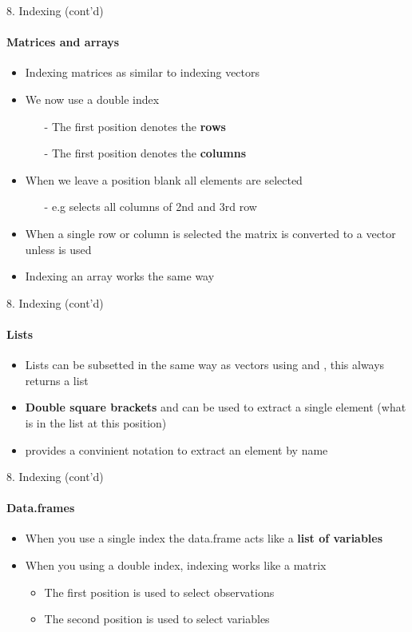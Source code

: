 \documentclass[14pt, aspectratio=169, sectionpage=simple, xclolor=table]{beamer}
\begin{document}
\begin{frame}[fragile]{8. Indexing (cont'd)}
\framesubtitle{Matrices and arrays}
\vspace*{-1ex}
\begin{itemize}
	\item Indexing matrices as similar to indexing vectors
	\item We now use a double index  
	\begin{itemize}
		\item[-] The first position denotes the \textbf{rows}
		\item[-] The first position denotes the \textbf{columns}
	\end{itemize}
    \item When we leave a position blank all elements are selected
   	\begin{itemize}
    	\item[-] e.g  selects all columns of 2nd and 3rd row
    \end{itemize}
     \item When a single row or column is selected the matrix is converted to a vector unless  is used
     \item Indexing an array works the same way
\end{itemize}
\end{frame}

\begin{frame}[fragile]{8. Indexing (cont'd)}
\vspace*{-1ex}
\framesubtitle{Lists}
\begin{itemize}
	\item Lists can be subsetted in the same way as vectors using \code{[} and \code{]}, this always returns a list
	\item \textbf{Double square brackets} \code{[[} and \code{]]} can be used to extract a single element (what is in the list at this position)
    \item \code{\$} provides a convinient notation to extract an element by name  
\end{itemize}
\end{frame}

\begin{frame}[fragile]{8. Indexing (cont'd)}
\vspace*{-1ex}
\framesubtitle{Data.frames}
\begin{itemize}
	\item When you use a single index the data.frame acts like a \textbf{list of variables}
	\item When you using a double index, indexing works like a matrix
	\begin{itemize}
		\item The first position is used to select observations 
		\item The second position is used to select variables
	\end{itemize}
\end{itemize}
\end{frame}
\end{document}
